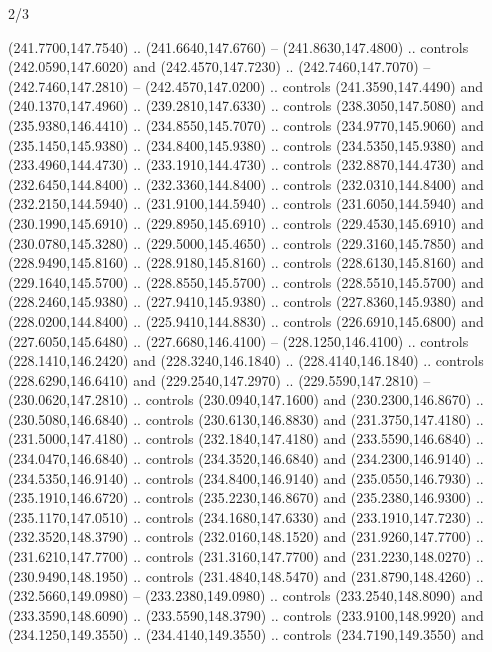 \begin{flagdescription}{2/3}
\begin{scope}[xshift=0.5\flaglength,yshift=0.5\flagwidth,scale=\flagwidth/259.2]
\begin{scope}[y=0.8pt, x=0.8pt, yscale=-1,shift={(-243,-162)}]
      (241.7700,147.7540) .. (241.6640,147.6760) -- (241.8630,147.4800) .. controls
      (242.0590,147.6020) and (242.4570,147.7230) .. (242.7460,147.7070) --
      (242.7460,147.2810) -- (242.4570,147.0200) .. controls (241.3590,147.4490) and
      (240.1370,147.4960) .. (239.2810,147.6330) .. controls (238.3050,147.5080) and
      (235.9380,146.4410) .. (234.8550,145.7070) .. controls (234.9770,145.9060) and
      (235.1450,145.9380) .. (234.8400,145.9380) .. controls (234.5350,145.9380) and
      (233.4960,144.4730) .. (233.1910,144.4730) .. controls (232.8870,144.4730) and
      (232.6450,144.8400) .. (232.3360,144.8400) .. controls (232.0310,144.8400) and
      (232.2150,144.5940) .. (231.9100,144.5940) .. controls (231.6050,144.5940) and
      (230.1990,145.6910) .. (229.8950,145.6910) .. controls (229.4530,145.6910) and
      (230.0780,145.3280) .. (229.5000,145.4650) .. controls (229.3160,145.7850) and
      (228.9490,145.8160) .. (228.9180,145.8160) .. controls (228.6130,145.8160) and
      (229.1640,145.5700) .. (228.8550,145.5700) .. controls (228.5510,145.5700) and
      (228.2460,145.9380) .. (227.9410,145.9380) .. controls (227.8360,145.9380) and
      (228.0200,144.8400) .. (225.9410,144.8830) .. controls (226.6910,145.6800) and
      (227.6050,145.6480) .. (227.6680,146.4100) -- (228.1250,146.4100) .. controls
      (228.1410,146.2420) and (228.3240,146.1840) .. (228.4140,146.1840) .. controls
      (228.6290,146.6410) and (229.2540,147.2970) .. (229.5590,147.2810) --
      (230.0620,147.2810) .. controls (230.0940,147.1600) and (230.2300,146.8670) ..
      (230.5080,146.6840) .. controls (230.6130,146.8830) and (231.3750,147.4180) ..
      (231.5000,147.4180) .. controls (232.1840,147.4180) and (233.5590,146.6840) ..
      (234.0470,146.6840) .. controls (234.3520,146.6840) and (234.2300,146.9140) ..
      (234.5350,146.9140) .. controls (234.8400,146.9140) and (235.0550,146.7930) ..
      (235.1910,146.6720) .. controls (235.2230,146.8670) and (235.2380,146.9300) ..
      (235.1170,147.0510) .. controls (234.1680,147.6330) and (233.1910,147.7230) ..
      (232.3520,148.3790) .. controls (232.0160,148.1520) and (231.9260,147.7700) ..
      (231.6210,147.7700) .. controls (231.3160,147.7700) and (231.2230,148.0270) ..
      (230.9490,148.1950) .. controls (231.4840,148.5470) and (231.8790,148.4260) ..
      (232.5660,149.0980) -- (233.2380,149.0980) .. controls (233.2540,148.8090) and
      (233.3590,148.6090) .. (233.5590,148.3790) .. controls (233.9100,148.9920) and
      (234.1250,149.3550) .. (234.4140,149.3550) .. controls (234.7190,149.3550) and

\end{scope}
\end{scope}
\end{flagdescription}

